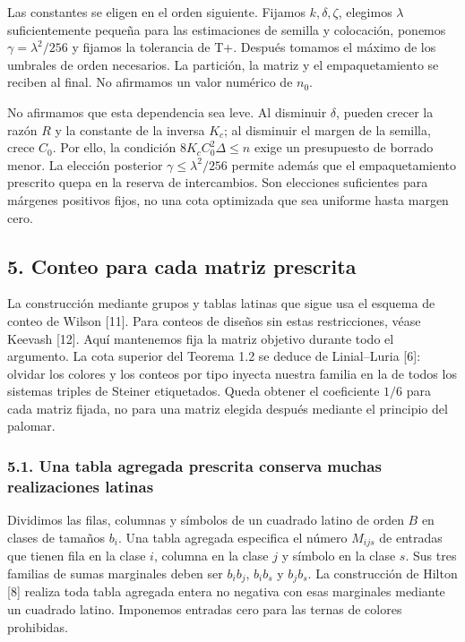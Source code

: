 \documentclass[spanish,11pt,a4paper]{article}
\begin{document}
Las constantes se eligen en el orden siguiente. Fijamos \(k,\delta,\zeta\), elegimos \(\lambda\) suficientemente pequeña para las estimaciones de semilla y colocación, ponemos \(\gamma=\lambda^2/256\) y fijamos la tolerancia de T+. Después tomamos el máximo de los umbrales de orden necesarios. La partición, la matriz y el empaquetamiento se reciben al final. No afirmamos un valor numérico de \(n_0\).

No afirmamos que esta dependencia sea leve. Al disminuir \(\delta\), pueden crecer la razón \(R\) y la constante de la inversa \(K_c\); al disminuir el margen de la semilla, crece \(C_0\). Por ello, la condición \(8K_cC_0^2\Delta\le n\) exige un presupuesto de borrado menor. La elección posterior \(\gamma\le\lambda^2/256\) permite además que el empaquetamiento prescrito quepa en la reserva de intercambios. Son elecciones suficientes para márgenes positivos fijos, no una cota optimizada que sea uniforme hasta margen cero.

\subsection{5. Conteo para cada matriz prescrita}\label{conteo-para-cada-matriz-prescrita}

La construcción mediante grupos y tablas latinas que sigue usa el esquema de conteo de Wilson {[}11{]}. Para conteos de diseños sin estas restricciones, véase Keevash {[}12{]}. Aquí mantenemos fija la matriz objetivo durante todo el argumento. La cota superior del Teorema 1.2 se deduce de Linial--Luria {[}6{]}: olvidar los colores y los conteos por tipo inyecta nuestra familia en la de todos los sistemas triples de Steiner etiquetados. Queda obtener el coeficiente \(1/6\) para cada matriz fijada, no para una matriz elegida después mediante el principio del palomar.

\subsubsection{5.1. Una tabla agregada prescrita conserva muchas realizaciones latinas}\label{una-tabla-agregada-prescrita-conserva-muchas-realizaciones-latinas}

Dividimos las filas, columnas y símbolos de un cuadrado latino de orden \(B\) en clases de tamaños \(b_i\). Una tabla agregada especifica el número \(M_{ijs}\) de entradas que tienen fila en la clase \(i\), columna en la clase \(j\) y símbolo en la clase \(s\). Sus tres familias de sumas marginales deben ser \(b_ib_j\), \(b_ib_s\) y \(b_jb_s\). La construcción de Hilton {[}8{]} realiza toda tabla agregada entera no negativa con esas marginales mediante un cuadrado latino. Imponemos entradas cero para las ternas de colores prohibidas.
\end{document}
